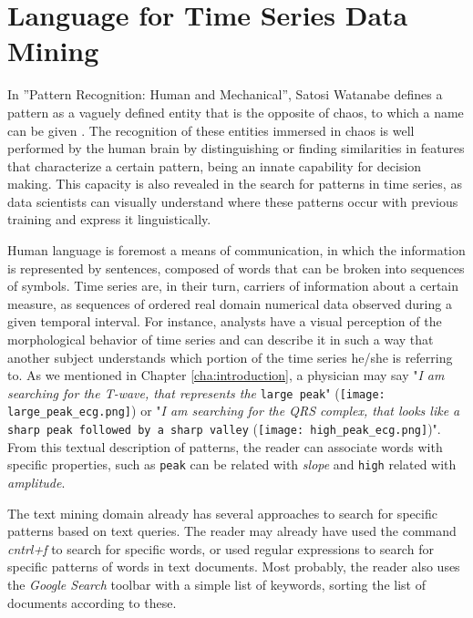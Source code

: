 
%

\chapter{Language for Time Series Data Mining}
\label{cha:text_}

In ”Pattern Recognition: Human and Mechanical”, Satosi Watanabe defines a pattern as a vaguely defined entity that is the opposite of chaos, to which a name can be given \cite{watanabe}. The recognition of these entities immersed in chaos is well performed by the human brain by distinguishing or finding similarities in features that characterize a certain pattern, being an innate capability for decision making. This capacity is also revealed in the search for patterns in time series, as data scientists can visually understand where these patterns occur with previous training and express it linguistically. 
\par
Human language is foremost a means of communication, in which the information is represented by sentences, composed of words that can be broken into sequences of symbols. Time series are, in their turn, carriers of information about a certain measure, as sequences of ordered real domain numerical data observed during a given temporal interval. For instance, analysts have a visual perception of the morphological behavior of time series and can describe it in such a way that another subject understands which portion of the time series he/she is referring to. As we mentioned in Chapter \ref{cha:introduction}, a physician may say "\textit{I am searching for the T-wave, that represents the} \texttt{large peak}" (\texttt{[image: large\_peak\_ecg.png]}) or "\textit{I am searching for the QRS complex, that looks like a} \texttt{sharp peak followed by a sharp valley} (\texttt{[image: high\_peak\_ecg.png]})". From this textual description of patterns, the reader can associate words with specific properties, such as \texttt{peak} can be related with \textit{slope} and \texttt{high} related with \textit{amplitude}.
\par
The text mining domain already has several approaches to search for specific patterns based on text queries. The reader may already have used the command \textit{cntrl+f} to search for specific words, or used regular expressions to search for specific patterns of words in text documents. Most probably, the reader also uses the \textit{Google Search} toolbar with a simple list of keywords, sorting the list of documents according to these.

